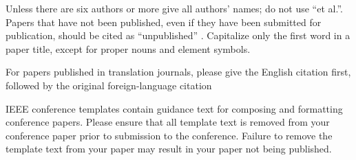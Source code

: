 \documentclass[conference]{IEEEtran}
\begin{document}
Unless there are six authors or more give all authors' names; do not use 
``et al.''. Papers that have not been published, even if they have been 
submitted for publication, should be cited as ``unpublished'' . 
Capitalize only the first word in a paper title, except for proper nouns and 
element symbols.

For papers published in translation journals, please give the English 
citation first, followed by the original foreign-language citation 
\cite{kabir2021}




\vspace{12pt}
\color{red}
IEEE conference templates contain guidance text for composing and formatting conference papers. Please ensure that all template text is removed from your conference paper prior to submission to the conference. Failure to remove the template text from your paper may result in your paper not being published.
\end{document}
